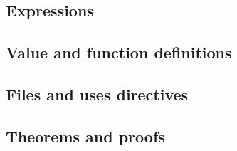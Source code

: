 \subsection{Expressions}

\subsection{Value and function definitions}

\subsection{Files and uses directives}

\subsection{Theorems and proofs}
